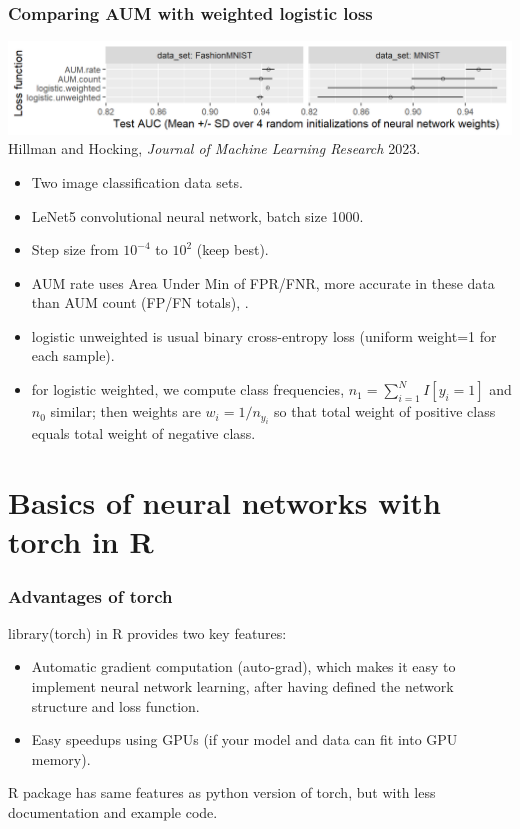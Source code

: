 \documentclass{beamer}
\begin{document}
\begin{frame}
  \frametitle{Comparing AUM with weighted logistic loss}
  \includegraphics[width=\textwidth]{figure-aum-neural-networks-test-auc}
  Hillman and Hocking, \emph{Journal of Machine Learning Research} 2023.
  \begin{itemize}
  \item Two image classification data sets.
  \item LeNet5 convolutional neural network, batch size 1000.
  \item Step size from $10^{-4}$ to $10^2$ (keep best).
  \item AUM rate uses Area Under Min of FPR/FNR, more accurate in
    these data than AUM count (FP/FN totals), .
  \item logistic unweighted is usual binary cross-entropy loss (uniform weight=1 for each sample). 
  \item for logistic weighted, we compute class frequencies, $n_1=\sum_{i=1}^N I[y_i=1]$ and $n_0$ similar; then weights are $w_i=1/n_{y_i}$ so that total weight of positive class equals total weight of negative class.
  \end{itemize}
\end{frame}

\section{Basics of neural networks with torch in R}

\begin{frame}
  \frametitle{Advantages of torch}
  library(torch) in R provides two key features:
  \begin{itemize}
  \item Automatic gradient computation (auto-grad), which makes it
    easy to implement neural network learning, after having defined
    the network structure and loss function.
  \item Easy speedups using GPUs (if your model and data can fit into
    GPU memory).
  \end{itemize}
  R package has same features as python version of torch, but with
  less documentation and example code.
\end{frame}
\end{document}
